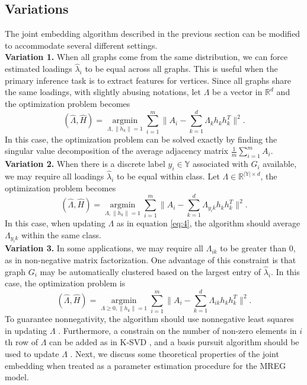 \documentclass[10pt,journal,compsoc]{IEEEtran}
\begin{document}
\subsection{Variations}
The joint embedding algorithm described in the previous section can be modified to accommodate several different settings. \\
\textbf{Variation 1.} When all graphs come from the same distribution, we can force estimated loadings $\hat{\lambda}_i$ to be equal across all graphs. This is useful when the primary inference task is to extract features for vertices. Since all graphs share the same loadings, with slightly abusing notations, let $\Lambda$ be a vector in $\mathbb{R}^d$ and the optimization problem becomes
\[ (\hat{\Lambda},\hat{H}) = \underset{\Lambda,\|h_k\|=1}{\operatorname{argmin}} \sum\limits_{i=1}^{m} \| A_i- \sum\limits_{k=1}^{d} \Lambda_{k} h_k h_k^T \|  ^2.  \] 
In this case, the optimization problem can be solved exactly by finding the singular value decomposition of the average adjacency matrix $\frac{1}{m}\sum\limits_{i=1}^{m}A_i$. \\
\textbf{Variation 2.} When there is a discrete label $y_i \in \mathbb{Y}$ associated with $G_i$ available, we may require all loadings $\hat{\lambda}_i$ to be equal within class. Let $\Lambda \in \mathbb{R}^{|\mathbb{Y}| \times d}$, the optimization problem becomes
\[ (\hat{\Lambda},\hat{H}) = \underset{\Lambda,\|h_k\|=1}{\operatorname{argmin}} \sum\limits_{i=1}^{m} \| A_i- \sum\limits_{k=1}^{d} \Lambda_{y_i k} h_k h_k ^T \|  ^2.  \] 
In this case, when updating $\Lambda$ as in equation \eqref{eq:4}, the algorithm should average $\Lambda_{y_i k}$ within the same class. \\
\textbf{Variation 3.} In some applications, we may require all $\Lambda_{ik}$ to be greater than $0$, as in non-negative matrix factorization. One advantage of this constraint is that graph $G_i$ may be automatically clustered  based on the largest entry of $\hat{\lambda}_{i}$. In this case, the optimization problem is
\[ (\hat{\Lambda},\hat{H}) = \underset{\Lambda \geq 0,\|h_k\|=1}{\operatorname{argmin}} \sum\limits_{i=1}^{m} \| A_i- \sum\limits_{k=1}^{d} \Lambda_{ik} h_k h_k ^T \|  ^2.  \] 
To guarantee nonnegativity, the algorithm should use nonnegative least squares in updating $\Lambda$ \cite{kim2008nonnegative}. Furthermore, a constrain on the number of non-zero elements in $i$th row of $\Lambda$ can be added as in K-SVD \cite{aharon2006rm}, and a basis pursuit algorithm should be used to update $\Lambda$ \cite{chen2001atomic, tropp2007signal}. Next, we discuss some theoretical properties of the joint embedding when treated as a parameter estimation procedure for the MREG model.
\end{document}
